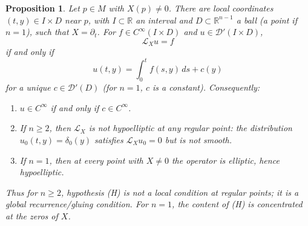 \documentclass[12pt]{article}
\newtheorem{proposition}[theorem]{Proposition}
\theoremstyle{definition}
\newcommand{\R}{\mathbb{R}}
\newcommand{\D}{\mathcal{D}}
\begin{document}
\begin{proposition}\label{prop:flowbox}
Let \(p\in M\) with \(X(p)\neq 0\).  There are local coordinates \((t,y)\in I\times D\) near \(p\), with \(I\subset\R\) an interval and \(D\subset\R^{n-1}\) a ball (a point if \(n=1\)), such that \(X=\partial_t\).  For \(f\in C^\infty(I\times D)\) and \(u\in \D'(I\times D)\),
\[
\mathcal L_X u=f
\]
if and only if
\[
u(t,y)=\int_0^t f(s,y)\,ds+c(y)
\]
for a unique \(c\in \D'(D)\) (for \(n=1\), \(c\) is a constant).  Consequently:
\begin{enumerate}
\item \(u\in C^\infty\) if and only if \(c\in C^\infty\).
\item If \(n\ge 2\), then \(\mathcal L_X\) is not hypoelliptic at any regular point: the distribution \(u_0(t,y)=\delta_0(y)\) satisfies \(\mathcal L_X u_0=0\) but is not smooth.
\item If \(n=1\), then at every point with \(X\neq 0\) the operator is elliptic, hence hypoelliptic.
\end{enumerate}
Thus for \(n\ge 2\), hypothesis (H) is not a local condition at regular points; it is a global recurrence/gluing condition.  For \(n=1\), the content of (H) is concentrated at the zeros of \(X\).
\end{proposition}
\end{document}
